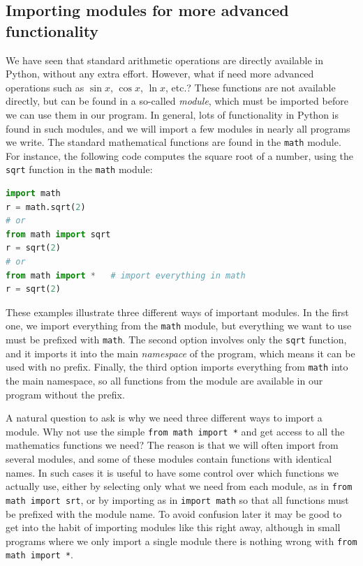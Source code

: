 \documentclass[graybox,envcountchap,sectrefs,final]{svmonodo}
\begin{document}
\subsection{Importing modules for more advanced functionality}
We have seen that standard arithmetic operations are directly available in Python, without any
extra effort. However, what if need more advanced operations such as $\sin x$, $\cos x$, $\ln x$, etc.?
These functions are not available directly, but can be found in a so-called \emph{module},
which must be imported before we can use them in our program. In general, lots of functionality in Python
is found in such modules, and we will import a few modules in nearly all programs we write. The standard
mathematical functions are found in the \texttt{math} module. For instance, the following code computes
the square root of a number, using the \texttt{sqrt} function in the \texttt{math} module:
\begin{lstlisting}[language=Python,style=blue1]
import math
r = math.sqrt(2)
# or
from math import sqrt
r = sqrt(2)
# or
from math import *   # import everything in math
r = sqrt(2)
\end{lstlisting}
These examples illustrate three different ways of important modules. In the first one, we import
everything from the \texttt{math} module, but everything we want to use must be prefixed with \texttt{math}. The
second option involves only the \texttt{sqrt} function, and it imports it into the main \emph{namespace} of the
program, which means it can be used with no prefix. Finally, the third option imports everything
from \texttt{math} into the main namespace, so all functions from the module are available in our program
without the prefix.

A natural question to ask is why we need three different ways to import a module. Why not use the
simple \texttt{from math import *} and get access to all the mathematics functions we need? The reason is
that we will often import from several modules, and some of these modules contain functions with
identical names. In such cases it is useful to have some control over which functions we actually
use, either by selecting only what we need from each module, as in \texttt{from math import srt}, or
by importing as in \texttt{import math} so that all functions must be prefixed with the module name.
To avoid confusion later it may be good to get into the habit of importing modules like this right away,
although in small programs where we only import a single module there is nothing wrong with \texttt{from math import *}.
\end{document}
